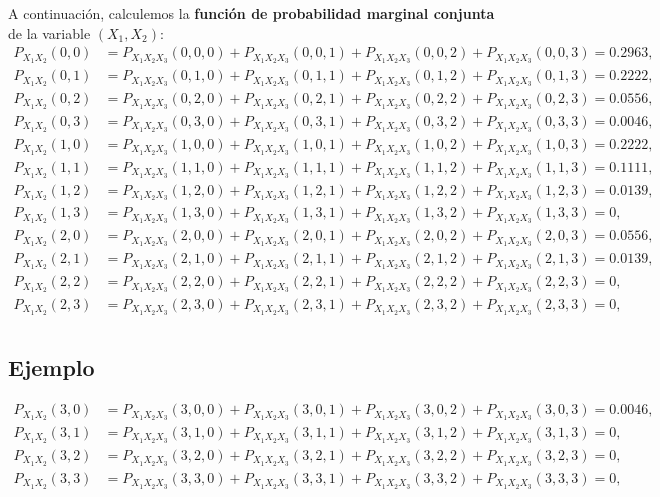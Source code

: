 \documentclass[]{book}
\begin{document}
A continuación, calculemos la \textbf{función de probabilidad marginal conjunta} de la variable \((X_1,X_2)\):
\[
\begin{array}{rl}
P_{X_1X_2}(0,0) & = P_{X_1X_2X_3}(0,0,0)+P_{X_1X_2X_3}(0,0,1)+P_{X_1X_2X_3}(0,0,2)+P_{X_1X_2X_3}(0,0,3)=0.2963, \\
P_{X_1X_2}(0,1) & = P_{X_1X_2X_3}(0,1,0)+P_{X_1X_2X_3}(0,1,1)+P_{X_1X_2X_3}(0,1,2)+P_{X_1X_2X_3}(0,1,3)=0.2222, \\
P_{X_1X_2}(0,2) & = P_{X_1X_2X_3}(0,2,0)+P_{X_1X_2X_3}(0,2,1)+P_{X_1X_2X_3}(0,2,2)+P_{X_1X_2X_3}(0,2,3)=0.0556, \\
P_{X_1X_2}(0,3) & = P_{X_1X_2X_3}(0,3,0)+P_{X_1X_2X_3}(0,3,1)+P_{X_1X_2X_3}(0,3,2)+P_{X_1X_2X_3}(0,3,3)=0.0046, \\
P_{X_1X_2}(1,0) & = P_{X_1X_2X_3}(1,0,0)+P_{X_1X_2X_3}(1,0,1)+P_{X_1X_2X_3}(1,0,2)+P_{X_1X_2X_3}(1,0,3)=0.2222, \\
P_{X_1X_2}(1,1) & = P_{X_1X_2X_3}(1,1,0)+P_{X_1X_2X_3}(1,1,1)+P_{X_1X_2X_3}(1,1,2)+P_{X_1X_2X_3}(1,1,3)=0.1111, \\
P_{X_1X_2}(1,2) & = P_{X_1X_2X_3}(1,2,0)+P_{X_1X_2X_3}(1,2,1)+P_{X_1X_2X_3}(1,2,2)+P_{X_1X_2X_3}(1,2,3)=0.0139, \\
P_{X_1X_2}(1,3) & = P_{X_1X_2X_3}(1,3,0)+P_{X_1X_2X_3}(1,3,1)+P_{X_1X_2X_3}(1,3,2)+P_{X_1X_2X_3}(1,3,3)=0, \\
P_{X_1X_2}(2,0) & = P_{X_1X_2X_3}(2,0,0)+P_{X_1X_2X_3}(2,0,1)+P_{X_1X_2X_3}(2,0,2)+P_{X_1X_2X_3}(2,0,3)=0.0556, \\
P_{X_1X_2}(2,1) & = P_{X_1X_2X_3}(2,1,0)+P_{X_1X_2X_3}(2,1,1)+P_{X_1X_2X_3}(2,1,2)+P_{X_1X_2X_3}(2,1,3)=0.0139, \\
P_{X_1X_2}(2,2) & = P_{X_1X_2X_3}(2,2,0)+P_{X_1X_2X_3}(2,2,1)+P_{X_1X_2X_3}(2,2,2)+P_{X_1X_2X_3}(2,2,3)=0, \\
P_{X_1X_2}(2,3) & = P_{X_1X_2X_3}(2,3,0)+P_{X_1X_2X_3}(2,3,1)+P_{X_1X_2X_3}(2,3,2)+P_{X_1X_2X_3}(2,3,3)=0, \\
\end{array}
\]

\hypertarget{ejemplo-95}{%
\subsection{Ejemplo}\label{ejemplo-95}}

\[
\begin{array}{rl}
P_{X_1X_2}(3,0) & = P_{X_1X_2X_3}(3,0,0)+P_{X_1X_2X_3}(3,0,1)+P_{X_1X_2X_3}(3,0,2)+P_{X_1X_2X_3}(3,0,3)=0.0046, \\
P_{X_1X_2}(3,1) & = P_{X_1X_2X_3}(3,1,0)+P_{X_1X_2X_3}(3,1,1)+P_{X_1X_2X_3}(3,1,2)+P_{X_1X_2X_3}(3,1,3)=0, \\
P_{X_1X_2}(3,2) & = P_{X_1X_2X_3}(3,2,0)+P_{X_1X_2X_3}(3,2,1)+P_{X_1X_2X_3}(3,2,2)+P_{X_1X_2X_3}(3,2,3)=0, \\
P_{X_1X_2}(3,3) & = P_{X_1X_2X_3}(3,3,0)+P_{X_1X_2X_3}(3,3,1)+P_{X_1X_2X_3}(3,3,2)+P_{X_1X_2X_3}(3,3,3)=0, \\
\end{array}
\]
\end{document}

